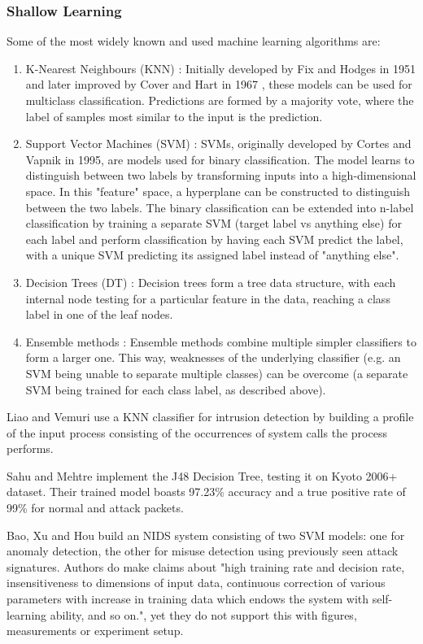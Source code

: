 \subsubsection{Shallow Learning}
Some of the most widely known and used machine learning algorithms are:
\begin{enumerate}
    \item K-Nearest Neighbours (KNN) \cite{knn}: Initially developed by Fix and Hodges in 1951 \cite{fix_hodges} and later improved by Cover and Hart in 1967 \cite{knn}, these models can be used for multiclass classification. Predictions are formed by a majority vote, where the label of samples most similar to the input is the prediction.
    \item Support Vector Machines (SVM) \cite{svm}: SVMs, originally developed by Cortes and Vapnik in 1995, are models used for binary classification. The model learns to distinguish between two labels by transforming inputs into a high-dimensional space. In this "feature" space, a hyperplane can be constructed to distinguish between the two labels. The binary classification can be extended into n-label classification by training a separate SVM (target label vs anything else) for each label and perform classification by having each SVM predict the label, with a unique SVM predicting its assigned label instead of "anything else".
    \item Decision Trees (DT) \cite{decision_trees}: Decision trees form a tree data structure, with each internal node testing for a particular feature in the data, reaching a class label in one of the leaf nodes.
    \item Ensemble methods \cite{ensemble}: Ensemble methods combine multiple simpler classifiers to form a larger one. This way, weaknesses of the underlying classifier (e.g. an SVM being unable to separate multiple classes) can be overcome (a separate SVM being trained for each class label, as described above).
\end{enumerate}

Liao and Vemuri \cite{knn_2002} use a KNN classifier for intrusion detection by building a profile of the input process consisting of the occurrences of system calls the process performs.

Sahu and Mehtre \cite{j48_dt} implement the J48 Decision Tree, testing it on Kyoto 2006+ dataset. Their trained model boasts 97.23\% accuracy and a true positive rate of 99\% for normal and attack packets.  

Bao, Xu and Hou \cite{nids_svm} build an NIDS system consisting of two SVM models: one for anomaly detection, the other for misuse detection using previously seen attack signatures. Authors do make claims about "high training rate and decision rate, insensitiveness to dimensions of input data, continuous correction of various parameters with increase in training data which endows the system with self-learning ability, and so on.", yet they do not support this with figures, measurements or experiment setup. 

